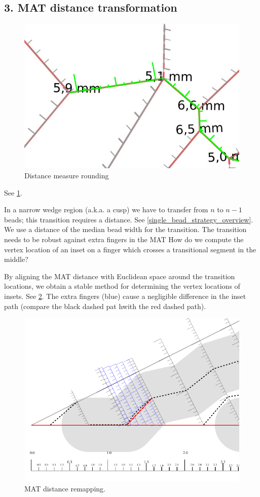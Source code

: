 \subsection{3. MAT distance transformation}

\begin{figure}
\centering
\includegraphics[width=.6\columnwidth]{sources/method/rounded_dist_measures.jpg}
\caption{Distance measure rounding}
\label{rounded_dist_measures}
\end{figure}

See \cref{rounded_dist_measures}.

In a narrow wedge region (a.k.a. a cusp) we have to transfer from $n$ to $n-1$ beads; this transition requires a distance.
See \cref{single_bead_strategy_overview}.
We use a distance of the median bead width for the transition.
The transition needs to be robust against extra fingers in the MAT
How do we compute the vertex location of an inset on a finger which crosses a transitional segment in the middle?

By aligning the MAT distance with Euclidean space around the transition locations, we obtain a stable method for determining the vertex locations of insets.
See \cref{distance_rounding_transition}.
The extra fingers (blue) cause a negligible difference in the inset path (compare the black dashed pat hwith the red dashed path).

\begin{figure}[H]
\centering
\includegraphics[width=.9\columnwidth]{sources/method/distance_rounding_transition.pdf}
\caption{MAT distance remapping.}
\label{distance_rounding_transition}
\end{figure}



